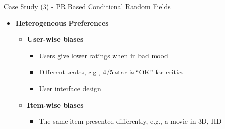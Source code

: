 \documentclass[
 size=14pt,
 paper=smartboard,  %
 mode=present, 		%
 display=slides, 	%
 style=tuliplab,  	%
 pauseslide,
 fleqn,leqno]{powerdot}{}
\begin{document}
\begin{slide}[toc=,bm=]{Case Study (3) - PR Based Conditional Random Fields}
	
	
	\begin{itemize}
		\item  \textbf{Heterogeneous Preferences}
		
		\begin{itemize}
			\item \textbf{User-wise biases}
			\begin{itemize}
				\item Users give lower ratings when in bad mood
				
				\item Different scales, e.g., 4/5 star is ``OK'' for critics
				
				\item User interface design
				
			\end{itemize}
			
			\item \textbf{Item-wise biases}
			
			\begin{itemize}
				
				\item The same item presented differently,
				e.g., a movie in 3D, HD
				
			\end{itemize}
		\end{itemize}
	\end{itemize}
	
	
\end{slide}
\end{document}
